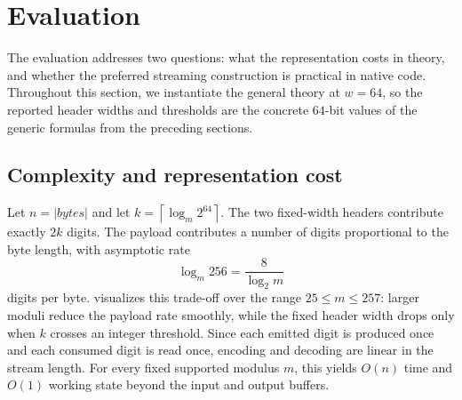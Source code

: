 \documentclass{system-security-article}
\newcommand{\ceil}[1]{\left\lceil #1 \right\rceil}
\newcommand{\abs}[1]{\left| #1 \right|}
\newcommand{\BytesVar}{\mathit{bytes}}
\begin{document}
    \section{Evaluation}
    \label{sec:evaluation}

    The evaluation addresses two questions: what the representation costs in theory,
    and whether the preferred streaming construction is practical in native code.
    Throughout this section, we instantiate the general theory at \(w=64\), so the reported header widths and
    thresholds are the concrete \(64\)-bit values of the generic formulas from the preceding sections.

    \subsection{Complexity and representation cost}
    \label{subsec:expansion}

    Let \(n = \abs{\BytesVar}\) and let \(k = \ceil{\log_m 2^{64}}\).
    The two fixed-width headers contribute exactly \(2k\) digits.
    The payload contributes a number of digits proportional to the byte length, with asymptotic rate
    \[
        \log_m 256 = \frac{8}{\log_2 m}
    \]
    digits per byte.
     visualizes this trade-off over the range \(25 \le m \le 257\):
    larger moduli reduce the payload rate smoothly, while the fixed header width drops only when
    \(k\) crosses an integer threshold.
    Since each emitted digit is produced once and each consumed digit is read once, encoding
    and decoding are linear in the stream length.
    For every fixed supported modulus \(m\), this yields \(O(n)\) time and \(O(1)\) working state
    beyond the input and output buffers.
\end{document}
